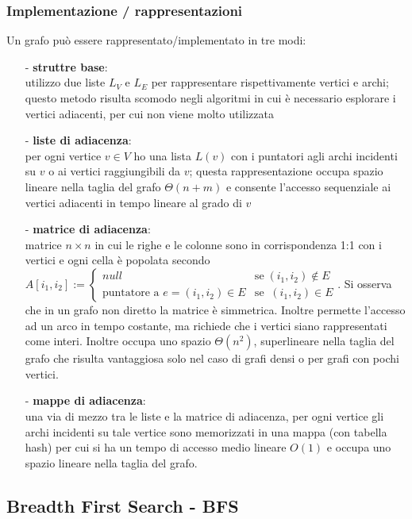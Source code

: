 \documentclass[a4paper]{article}
\begin{document}
\subsubsection*{Implementazione / rappresentazioni}
Un grafo può essere rappresentato/implementato in tre modi:
\begin{itemize}[topsep=3pt, itemsep=0pt]
	\item[-] \textbf{struttre base}: \\
	utilizzo due liste \(L_V\) e \(L_E\) per rappresentare rispettivamente vertici e archi; questo metodo risulta scomodo negli
	algoritmi in cui è necessario esplorare i vertici adiacenti, per cui non viene molto utilizzata
	\item[-] \textbf{liste di adiacenza}: \\
	per ogni vertice \(v \in V\) ho una lista \(L(v)\) con i puntatori agli archi incidenti su \(v\) o ai vertici raggiungibili
	da \(v\); questa rappresentazione occupa spazio lineare nella taglia del grafo \(\Theta(n+m)\) e consente l'accesso sequenziale
	ai vertici adiacenti in tempo lineare al grado di \(v\)
	\item[-] \textbf{matrice di adiacenza}: \\
	matrice \(n \times n\) in cui le righe e le colonne sono in corrispondenza 1:1 con i vertici e ogni cella è popolata secondo
	\(A[i_1,i_2] := \begin{cases} null & \text{se} \; (i_1, i_2) \notin E \\ \text{puntatore a } e = (i_1, i_2) \in E & \text{se}\; \; (i_1, i_2) \in E \end{cases}\).
	Si osserva che in un grafo non diretto la matrice è simmetrica. Inoltre permette l'accesso ad un arco in tempo costante, ma
	richiede che i vertici siano rappresentati come interi. Inoltre occupa uno spazio \(\Theta(n^2)\), superlineare nella taglia
	del grafo che risulta vantaggiosa solo nel caso di grafi densi o per grafi con pochi vertici.
	\item[-] \textbf{mappe di adiacenza}: \\
	una via di mezzo tra le liste e la matrice di adiacenza, per ogni vertice gli archi incidenti su tale vertice sono memorizzati
	in una mappa (con tabella hash) per cui si ha un tempo di accesso medio lineare \(O(1)\) e occupa uno spazio lineare nella
	taglia del grafo.
\end{itemize}

\newpage

\subsection{Breadth First Search - BFS}
\end{document}
